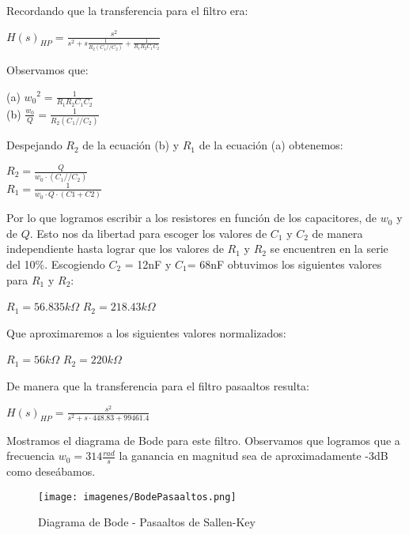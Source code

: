 \documentclass[12pt, titlepage]{article}
\begin{document}
    
    Recordando que la transferencia para el filtro era: 
     \begin{center}
        $H(s)_{HP}= \frac{s^2}{s^2+s\frac{1}{R_2(C_1//C_2)}+\frac{1}{R_1R_2C_1C_2}}$
    \end{center}
    
    Observamos que:
    \begin{center}
        (a) ${w_0}^2 = \frac{1}{R_1R_2C_1C_2}$\\
        (b) $\frac{w_0}{Q} = \frac{1}{R_2(C_1//C_2)}$
    \end{center}
    Despejando $R_2$ de la ecuación (b) y $R_1$ de la ecuación (a) obtenemos:
    \begin{center}
        $R_2= \frac{Q}{w_0 \cdot (C_1//C_2)}$\\
        $R_1= \frac{1}{w_0 \cdot Q \cdot (C1+C2)}$
    \end{center}
    Por lo que logramos escribir a los resistores en función de los capacitores, de $w_0$ y de $Q$. Esto nos da libertad para escoger los valores de $C_1$ y $C_2$ de manera independiente hasta lograr que los valores de $R_1$ y $R_2$ se encuentren en la serie del 10\%. Escogiendo $C_2$ = 12nF y $C_1$= 68nF obtuvimos los siguientes valores para $R_1$ y $R_2$:
    
    \begin{center}
        $R_1 =  56.835k\Omega$ \hspace{5mm} $R_2 = 218.43k\Omega$
    \end{center}
    
    Que aproximaremos a los siguientes valores normalizados:
    \begin{center}
        $R_1 = 56k\Omega$ \hspace{5mm} $R_2 = 220k\Omega$
    \end{center}
    
    De manera que la transferencia para el filtro pasaaltos resulta:
    \begin{center}
        $H(s)_{HP} = \frac{s^2}{s^2 +s\cdot448.83 + 99461.4}$
    \end{center}

    Mostramos el diagrama de Bode para este filtro. Observamos que logramos que a frecuencia $w_0 = 314\frac{rad}{s}$ la ganancia en magnitud sea de aproximadamente -3dB como deseábamos.
  
    \begin{figure}[!htb]
    \texttt{[image: imagenes/BodePasaaltos.png]}
    \centering
    \caption{Diagrama de Bode - Pasaaltos de Sallen-Key}
    \end{figure}
  
\end{document}

